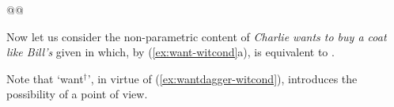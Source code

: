 @@

Now let us consider the non-parametric content of \textit{Charlie
  wants to buy a coat like Bill's} given in  which, by
(\ref{ex:want-witcond}a), is equivalent to .
\begin{ex} 
\begin{subex} 
 
\item {} 
 
\item {} 
 
\end{subex} 
   
\end{ex} 
Note that `want$^\dagger$', in virtue of
(\ref{ex:wantdagger-witcond}), introduces the possibility of a point
of view.

